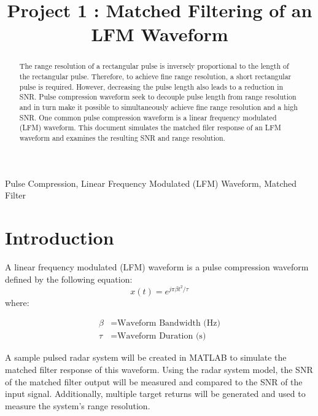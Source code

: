 \documentclass[conference]{IEEEtran}
\begin{document}
\title{Project 1 : Matched Filtering of an LFM Waveform}

\author{
}
\maketitle

\begin{abstract}
The range resolution of a rectangular pulse is inversely proportional to the length of the rectangular pulse. Therefore, to achieve fine range resolution, a short rectangular pulse is required. However, decreasing the pulse length also leads to a reduction in SNR. Pulse compression waveform seek to decouple pulse length from range resolution and in turn make it possible to simultaneously achieve fine range resolution and a high SNR. One common pulse compression waveform is a linear frequency modulated (LFM) waveform. This document simulates the matched filer response of an LFM waveform and examines the resulting SNR and range resolution.
\end{abstract}

\begin{IEEEkeywords}
Pulse Compression, Linear Frequency Modulated (LFM) Waveform, Matched Filter
\end{IEEEkeywords}
\section{Introduction}
A linear frequency modulated (LFM) waveform is a pulse compression waveform defined by the following equation:
\begin{equation}
x(t)=e^{j\pi\beta t^2/\tau}
\label{lfm_waveform}
\end{equation}
where:
\begin{fleqn}[\parindent]
\begin{align*}
\beta &= \text{Waveform Bandwidth (Hz)}\\
\tau &= \text{Waveform Duration (s)}
\end{align*}
\end{fleqn}
A sample pulsed radar system will be created in MATLAB to simulate the matched filter response of this waveform. Using the radar system model, the SNR of the matched filter output will be measured and compared to the SNR of the input signal. Additionally, multiple target returns will be generated and used to measure the system's range resolution.
\end{document}
